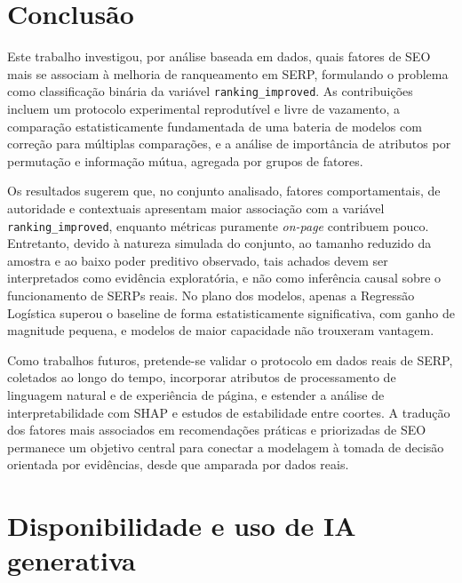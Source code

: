\documentclass[12pt]{article}
\begin{document}
\section{Conclusão}
\label{sec:conclusao}

Este trabalho investigou, por análise baseada em dados, quais fatores de SEO mais se associam à
melhoria de ranqueamento em SERP, formulando o problema como classificação binária da variável
\texttt{ranking\_improved}. As contribuições incluem um protocolo experimental reprodutível e livre
de vazamento, a comparação estatisticamente fundamentada de uma bateria de modelos com correção
para múltiplas comparações, e a análise de importância de atributos por permutação e informação
mútua, agregada por grupos de fatores.

Os resultados sugerem que, no conjunto analisado, fatores comportamentais, de autoridade e
contextuais apresentam maior associação com a variável \texttt{ranking\_improved}, enquanto métricas
puramente \textit{on-page} contribuem pouco. Entretanto, devido à natureza simulada do conjunto, ao
tamanho reduzido da amostra e ao baixo poder preditivo observado, tais achados devem ser
interpretados como evidência exploratória, e não como inferência causal sobre o funcionamento de
SERPs reais. No plano dos modelos, apenas a Regressão Logística superou o baseline de forma
estatisticamente significativa, com ganho de magnitude pequena, e modelos de maior capacidade não
trouxeram vantagem.

Como trabalhos futuros, pretende-se validar o protocolo em dados reais de SERP, coletados ao longo
do tempo, incorporar atributos de processamento de linguagem natural e de experiência de página, e
estender a análise de interpretabilidade com SHAP e estudos de estabilidade entre coortes. A
tradução dos fatores mais associados em recomendações práticas e priorizadas de SEO permanece um
objetivo central para conectar a modelagem à tomada de decisão orientada por evidências, desde que
amparada por dados reais.

\section*{Disponibilidade e uso de IA generativa}
\end{document}
